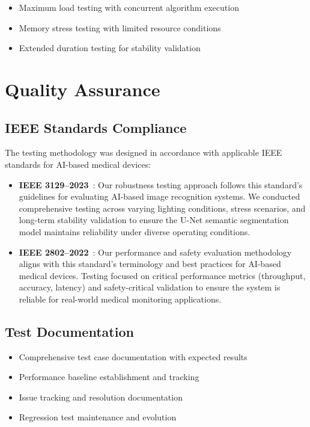 \begin{itemize}
\item Maximum load testing with concurrent algorithm execution
\item Memory stress testing with limited resource conditions
\item Extended duration testing for stability validation
\end{itemize}

\section{Quality Assurance}\label{sec:quality-assurance}

\subsection{IEEE Standards Compliance}\label{subsec:ieee-compliance}

The testing methodology was designed in accordance with applicable IEEE standards for AI-based medical devices:

\begin{itemize}
\item \textbf{IEEE 3129--2023}~\cite{ieee3129-2023}: Our robustness testing approach follows this standard's guidelines for evaluating AI-based image recognition systems. We conducted comprehensive testing across varying lighting conditions, stress scenarios, and long-term stability validation to ensure the U-Net semantic segmentation model maintains reliability under diverse operating conditions.

\item \textbf{IEEE 2802--2022}~\cite{ieee2802-2022}: Our performance and safety evaluation methodology aligns with this standard's terminology and best practices for AI-based medical devices. Testing focused on critical performance metrics (throughput, accuracy, latency) and safety-critical validation to ensure the system is reliable for real-world medical monitoring applications.
\end{itemize}

\subsection{Test Documentation}\label{subsec:test-documentation}

\begin{itemize}
\item Comprehensive test case documentation with expected results
\item Performance baseline establishment and tracking
\item Issue tracking and resolution documentation
\item Regression test maintenance and evolution
\end{itemize}
